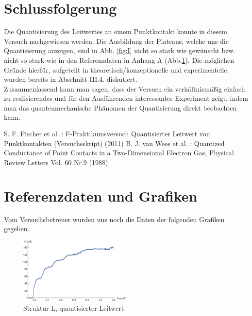 \documentclass[aps,twocolumn,secnumarabic,nobalancelastpage,amsmath,amssymb,
nofootinbib,superscriptaddress]{revtex4-1}
\begin{document}
\section{Schlussfolgerung}

Die Quantisierung des Leitwertes an einem Punktkontakt
konnte in diesem Versuch nachgewiesen werden. Die Ausbildung der Plateaus, welche
uns die Quantisierung anzeigen, sind in Abb. \ref{fig:I} nicht so stark wie gewünscht
bzw. nicht so stark wie in den Referenzdaten in Anhang A (Abb.\ref{fig:l}). Die
möglichen Gründe hierfür, aufgeteilt in theoretisch/konzeptionelle und experimentelle,
wurden bereits in Abschnitt III.4. diskutiert. \\
Zusammenfassend kann man sagen, dass der Versuch ein verhältnismäßig einfach zu
realisierendes und für den Ausführenden interessantes Experiment zeigt, indem man
das quantenmechanische Phänomen der Quantisierung direkt beobachten kann. \\




\begin{thebibliography}{99}
S. F. Fischer et al. : F-Praktikumsversuch Quantisierter Leitwert von Punktkontakten (Versuchsskript) (2011)
B. J. van Wees et al. : Quantized Conductance of Point Contacts in a Two-Dimensional Electron Gas, Physical Review Letters Vol. 60 Nr.9 (1988)
\end{thebibliography}


\appendix

\section{Referenzdaten und Grafiken}
Vom Versuchsbetreuer wurden uns noch die Daten der folgenden Grafiken gegeben.

\begin{figure}[h]
  \centering
  \includegraphics[width=0.5\textwidth]{Berechnung-Bilder/l.eps}
  \caption{Struktur L, quantisierter Leitwert}
  \label{fig:l}
\end{figure}
\end{document}

